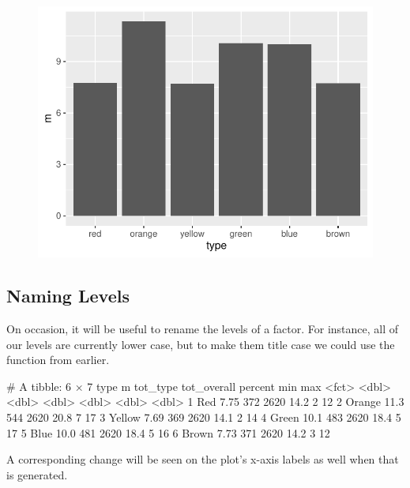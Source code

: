 \begin{figure}[H]
\includegraphics[scale = .75]{graphics/ch3Figs/bar_5.pdf}
\end{figure}

\subsection{Naming Levels}

On occasion, it will be useful to rename the levels of a factor. For instance, all of our levels are currently lower case, but to make them title case we could use the  function from earlier.

\begin{outR}
# A tibble: 6 × 7
  type       m tot_type tot_overall percent   min   max
  <fct>  <dbl>    <dbl>       <dbl>   <dbl> <dbl> <dbl>
1 Red     7.75      372        2620    14.2     2    12
2 Orange 11.3       544        2620    20.8     7    17
3 Yellow  7.69      369        2620    14.1     2    14
4 Green  10.1       483        2620    18.4     5    17
5 Blue   10.0       481        2620    18.4     5    16
6 Brown   7.73      371        2620    14.2     3    12
\end{outR}

\noindent
A corresponding change will be seen on the plot's x-axis labels as well when that is generated.

